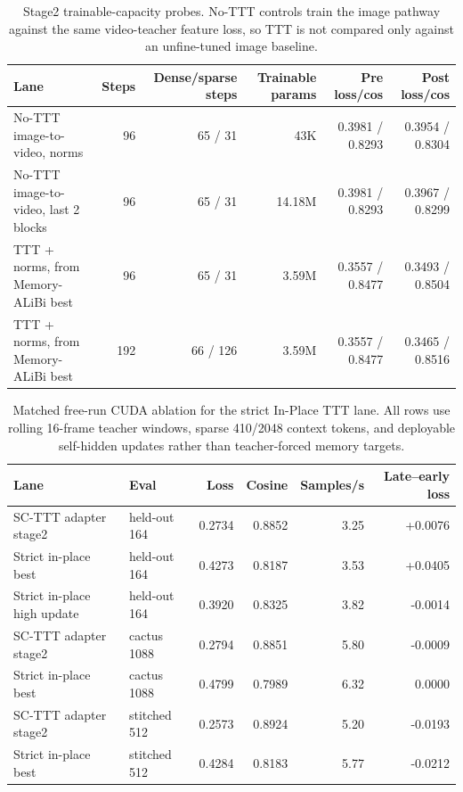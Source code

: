 \documentclass[10pt]{article}
\begin{document}
\begin{table}[t]
\centering
\scriptsize
\setlength{\tabcolsep}{3pt}
\caption{Stage2 trainable-capacity probes.  No-TTT controls train the image
pathway against the same video-teacher feature loss, so TTT is not compared
only against an unfine-tuned image baseline.}
\label{tab:stage2-probes}
\begin{tabular}{lrrrrr}
\toprule
Lane & Steps & Dense/sparse steps & Trainable params & Pre loss/cos & Post loss/cos \\
\midrule
No-TTT image-to-video, norms & 96 & 65 / 31 & 43K & 0.3981 / 0.8293 & 0.3954 / 0.8304 \\
No-TTT image-to-video, last 2 blocks & 96 & 65 / 31 & 14.18M & 0.3981 / 0.8293 & 0.3967 / 0.8299 \\
TTT + norms, from Memory-ALiBi best & 96 & 65 / 31 & 3.59M & 0.3557 / 0.8477 & 0.3493 / 0.8504 \\
TTT + norms, from Memory-ALiBi best & 192 & 66 / 126 & 3.59M & 0.3557 / 0.8477 & 0.3465 / 0.8516 \\
\bottomrule
\end{tabular}
\end{table}

\begin{table}[t]
\centering
\scriptsize
\setlength{\tabcolsep}{3pt}
\caption{Matched free-run CUDA ablation for the strict In-Place TTT lane.  All
rows use rolling 16-frame teacher windows, sparse 410/2048 context tokens, and
deployable self-hidden updates rather than teacher-forced memory targets.}
\label{tab:inplace-smoke}
\begin{tabular}{llrrrr}
\toprule
Lane & Eval & Loss & Cosine & Samples/s & Late--early loss \\
\midrule
SC-TTT adapter stage2 & held-out 164 & 0.2734 & 0.8852 & 3.25 & +0.0076 \\
Strict in-place best & held-out 164 & 0.4273 & 0.8187 & 3.53 & +0.0405 \\
Strict in-place high update & held-out 164 & 0.3920 & 0.8325 & 3.82 & -0.0014 \\
SC-TTT adapter stage2 & cactus 1088 & 0.2794 & 0.8851 & 5.80 & -0.0009 \\
Strict in-place best & cactus 1088 & 0.4799 & 0.7989 & 6.32 & 0.0000 \\
SC-TTT adapter stage2 & stitched 512 & 0.2573 & 0.8924 & 5.20 & -0.0193 \\
Strict in-place best & stitched 512 & 0.4284 & 0.8183 & 5.77 & -0.0212 \\
\bottomrule
\end{tabular}
\end{table}
\end{document}
